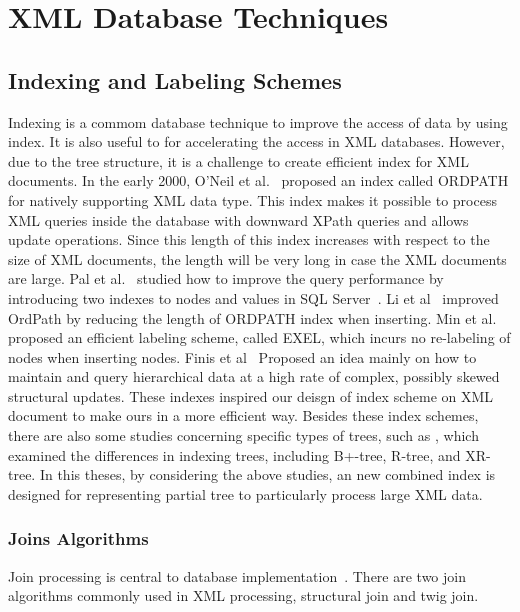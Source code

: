 \section{XML Database Techniques}

\subsection{Indexing and Labeling Schemes}

Indexing is a commom database technique to improve the access of data  by using
index. It is also useful to for accelerating the access in XML databases.
However, due to the tree structure, it is a challenge to create efficient  index
for XML documents. In the early 2000, O'Neil et al.~\cite{OOPC04} proposed an
index called ORDPATH for natively supporting XML data type. This index makes it
possible to process XML queries inside the database with downward XPath queries
and allows update operations. Since this length of this index increases with
respect to the size of XML documents, the length will be very long in case the
XML documents are large. Pal et al.~\cite{PCSS04} studied how to improve the
query performance by introducing two indexes to nodes and values in SQL
Server~\cite{sql2005}. Li et al~\cite{LiLi05} improved OrdPath by reducing the
length of ORDPATH index when inserting. Min et al.~\cite{MLCh07} proposed an
efficient labeling scheme, called EXEL, which incurs no re-labeling of nodes
when inserting nodes. Finis et al~\cite{FBKF15} Proposed an idea mainly on how
to maintain and query hierarchical data at a high rate of complex, possibly
skewed structural updates. These indexes inspired our deisgn of index scheme on
XML document to make ours in a more efficient way. Besides these index schemes, 
there are also some studies concerning specific types of trees, such as
\cite{ToGr02,JLWO03,CVZZ08}, which examined the differences in indexing trees,
including B+-tree, R-tree, and XR-tree. In this theses, by considering the above 
studies, an new combined index is designed for representing partial tree to 
particularly process large XML data.

\subsubsection{Joins Algorithms}

Join processing is central to database implementation~\cite{graefe1993query}.
There are two join algorithms commonly used in XML processing, structural join
and twig join.

